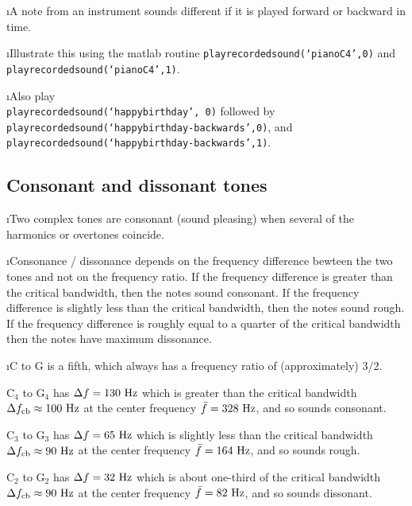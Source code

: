 
\i A note from an instrument sounds different if it is played 
forward or backward in time.

\i \demo Illustrate this using the matlab routine
{\tt playrecordedsound(`pianoC4',0)} and\\
{\tt playrecordedsound(`pianoC4',1)}.

\i \demo Also play\\
{\tt playrecordedsound(`happybirthday', 0)} followed by\\
{\tt playrecordedsound(`happybirthday-backwards',0)}, and\\
{\tt playrecordedsound(`happybirthday-backwards',1)}.

\ei
\subsection{Consonant and dissonant tones}
\bi

\i Two complex tones are consonant (sound pleasing) when several
of the harmonics or overtones coincide.

\i Consonance / dissonance depends on the frequency difference
bewteen the two tones and not on the frequency ratio.
If the frequency difference is greater than the critical
bandwidth, then the notes sound consonant.
If the frequency difference is slightly less than the critical
bandwidth, then the notes sound rough.
If the frequency difference is roughly equal to a quarter
of the critical bandwidth then the notes have maximum
dissonance.

\i \ex C to G is a fifth, which always has a 
frequency ratio of (approximately) 3/2.

C$_4$ to G$_4$ has $\Delta f=130~{\rm Hz}$ which is
greater than the critical bandwidth 
$\Delta f_{\rm cb}\approx 100~{\rm Hz}$
at the center frequency $\bar f=328~{\rm Hz}$, 
and so sounds consonant.

C$_3$ to G$_3$ has $\Delta f=65~{\rm Hz}$ which is
slightly less than the critical bandwidth 
$\Delta f_{\rm cb} \approx 90~{\rm Hz}$
at the center frequency $\bar f=164~{\rm Hz}$,
and so sounds rough.

C$_2$ to G$_2$ has $\Delta f=32~{\rm Hz}$ which is
about one-third of the critical bandwidth 
$\Delta f_{\rm cb}\approx 90~{\rm Hz}$ 
at the center frequency $\bar f=82~{\rm Hz}$, 
and so sounds dissonant.

